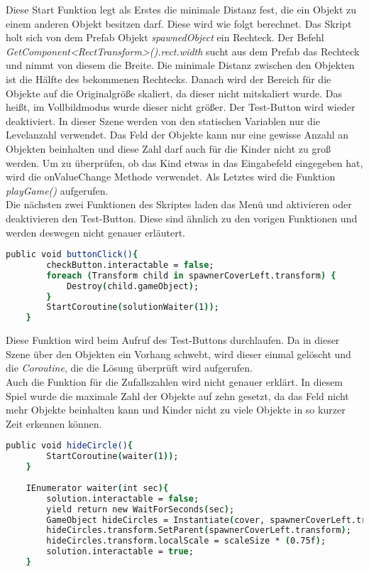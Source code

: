 Diese Start Funktion legt als Erstes die minimale Distanz fest, die ein Objekt zu einem anderen Objekt besitzen darf. Diese wird wie folgt berechnet. Das Skript holt sich von dem Prefab Objekt \textit{spawnedObject} ein Rechteck. Der Befehl \textit{GetComponent<RectTransform>().rect.width} sucht aus dem Prefab das Rechteck und nimmt von diesem die Breite. Die minimale Distanz zwischen den Objekten ist die Hälfte des bekommenen Rechtecks. Danach wird der Bereich für die Objekte auf die Originalgröße skaliert, da dieser nicht mitskaliert wurde. Das heißt, im Vollbildmodus wurde dieser nicht größer. Der Test-Button wird wieder deaktiviert. In dieser Szene werden von den statischen Variablen nur die Levelanzahl verwendet. Das Feld der Objekte kann nur eine gewisse Anzahl an Objekten beinhalten und diese Zahl darf auch für die Kinder nicht zu groß werden. Um zu überprüfen, ob das Kind etwas in das Eingabefeld eingegeben hat, wird die onValueChange Methode verwendet. Als Letztes wird die Funktion \textit{playGame()} aufgerufen.\\
Die nächsten zwei Funktionen des Skriptes laden das Menü und aktivieren oder deaktivieren den Test-Button. Diese sind ähnlich zu den vorigen Funktionen und werden deswegen nicht genauer erläutert.\\
\begin{lstlisting}[language=csh, caption={lightningView.cs buttonClick-Funktion}]
	public void buttonClick(){
		checkButton.interactable = false;
		foreach (Transform child in spawnerCoverLeft.transform) {
			Destroy(child.gameObject);
		}
		StartCoroutine(solutionWaiter(1));
	}
\end{lstlisting}
Diese Funktion wird beim Aufruf des Test-Buttons durchlaufen. Da in dieser Szene über den Objekten ein Vorhang schwebt, wird dieser einmal gelöscht und die \textit{Coroutine}, die die Lösung überprüft wird aufgerufen.\\
Auch die Funktion für die Zufallszahlen wird nicht genauer erklärt. In diesem Spiel wurde die maximale Zahl der Objekte auf zehn gesetzt, da das Feld nicht mehr Objekte beinhalten kann und Kinder nicht zu viele Objekte in so kurzer Zeit erkennen können.\\
\begin{lstlisting}[language=csh, caption={hideCircle.cs buttonClick-Funktion}]
	public void hideCircle(){
		StartCoroutine(waiter(1));
	}
	
	IEnumerator waiter(int sec){
		solution.interactable = false;
		yield return new WaitForSeconds(sec);
		GameObject hideCircles = Instantiate(cover, spawnerCoverLeft.transform.position, Quaternion.identity);
		hideCircles.transform.SetParent(spawnerCoverLeft.transform);
		hideCircles.transform.localScale = scaleSize * (0.75f);
		solution.interactable = true;
	}
\end{lstlisting}
